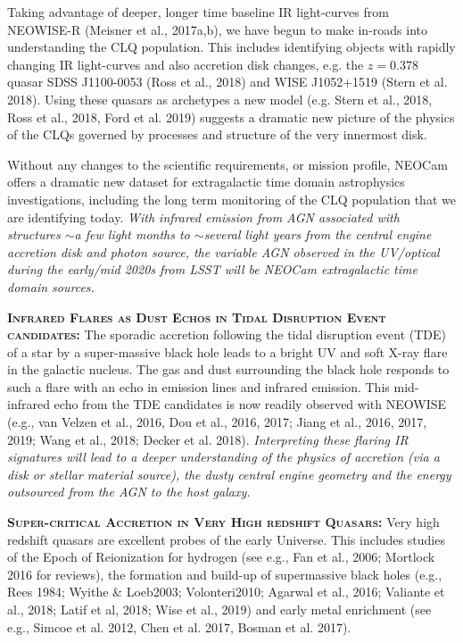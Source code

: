 \documentclass[12pt]{article}
\begin{document}
\smallskip
\smallskip
\noindent
Taking advantage of deeper, longer time baseline 
IR light-curves from NEOWISE-R (Meisner et al., 2017a,b), we have begun to make in-roads
into understanding the CLQ population.  This includes identifying
objects with rapidly changing IR light-curves and also accretion disk
changes, e.g. the $z=0.378$ quasar SDSS J1100-0053 (Ross et al., 2018)
and WISE J1052+1519 (Stern et al. 2018). Using these quasars as
archetypes a new model (e.g. Stern et al., 2018, Ross et al., 2018,
Ford et al. 2019) suggests a dramatic new picture of the physics of
the CLQs governed by processes and structure of the very innermost disk. 


\smallskip
\smallskip
\noindent
Without any changes to the scientific requirements, or mission profile, NEOCam offers 
a dramatic new dataset for extragalactic time domain astrophysics investigations, including
the long term monitoring of the CLQ population that we are identifying today.
{\it With infrared emission from AGN associated with structures $\sim$a few light months to $\sim$several light years from the central engine accretion disk and photon source, the variable AGN observed in the UV/optical during the early/mid 2020s from LSST will be NEOCam extragalactic time domain sources.}


\smallskip
\smallskip
\noindent
\textbf{\textsc{Infrared Flares as Dust Echos in Tidal Disruption Event candidates:}}   
The sporadic accretion following the tidal disruption event (TDE) of a star by a super-massive black hole leads to a bright UV and soft X-ray flare in the galactic nucleus. The gas and dust surrounding the black hole responds to such a flare with an echo in emission lines and infrared emission. This mid-infrared echo from the TDE candidates is now readily observed with NEOWISE (e.g., van Velzen et al., 2016, Dou et al.,  2016, 2017;  Jiang et al., 2016, 2017, 2019; Wang et al., 2018; Decker et al. 2018). {\it Interpreting these flaring IR signatures will lead to 
a deeper understanding of the physics of accretion (via a disk or stellar 
material source), the dusty central engine geometry and the energy
outsourced from the AGN to the host galaxy.}


\smallskip
\smallskip
\noindent
\textbf{\textsc{Super-critical Accretion in Very High redshift Quasars:}} 
Very high redshift quasars are excellent probes of the early Universe. This includes studies of the Epoch of Reionization for hydrogen (see e.g., Fan et al., 2006; Mortlock 2016 for reviews), the formation and build-up of supermassive black holes (e.g., Rees 1984; Wyithe \& Loeb2003; Volonteri2010; Agarwal et al., 2016; Valiante et al., 2018; Latif et al, 2018; Wise et al., 2019) and early metal enrichment (see e.g., Simcoe et al. 2012, Chen et al. 2017, Bosman et al. 2017).
\end{document}
